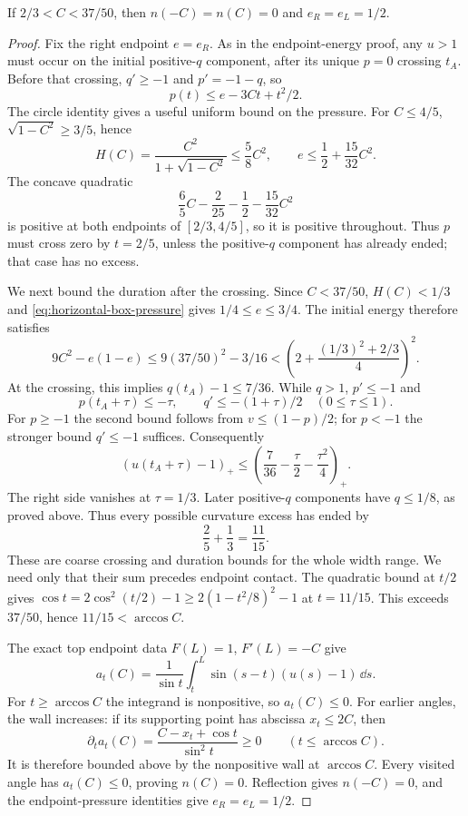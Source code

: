 \begin{lemma}\label{lem:horizontal-dry}
If $2/3<C<37/50$, then $n(-C)=n(C)=0$ and $e_R=e_L=1/2$.
\end{lemma}
\begin{proof}
Fix the right endpoint $e=e_R$. As in the endpoint-energy proof,
any $u>1$ must occur on the initial positive-$q$ component, after
its unique $p=0$ crossing $t_A$. Before that crossing,
$q'\ge-1$ and $p'=-1-q$, so
\[
 p(t)\le e-3Ct+t^2/2.
\]
The circle identity gives a useful uniform bound on the pressure.
For $C\le4/5$, $\sqrt{1-C^2}\ge3/5$, hence
\[
 H(C)=\frac{C^2}{1+\sqrt{1-C^2}}\le\frac58C^2,
 \qquad e\le\frac12+\frac{15}{32}C^2.
\]
The concave quadratic
\[
 \frac65C-\frac2{25}-\frac12-\frac{15}{32}C^2
\]
is positive at both endpoints of $[2/3,4/5]$, so it is positive
throughout. Thus $p$ must cross zero by $t=2/5$, unless the
positive-$q$ component has already ended; that case has no excess.

We next bound the duration after the crossing. Since $C<37/50$,
$H(C)<1/3$ and \eqref{eq:horizontal-box-pressure} gives
$1/4\le e\le3/4$. The initial energy therefore satisfies
\[
 9C^2-e(1-e)
 \le9(37/50)^2-3/16
 <\left(2+\frac{(1/3)^2+2/3}{4}\right)^2.
\]
At the crossing, this implies $q(t_A)-1\le7/36$.
While $q>1$, $p'\le-1$ and
\[
 p(t_A+\tau)\le-\tau,\qquad
 q'\le-(1+\tau)/2\quad(0\le\tau\le1).
\]
For $p\ge-1$ the second bound follows from $v\le(1-p)/2$;
for $p<-1$ the stronger bound $q'\le-1$ suffices.
Consequently
\begin{equation}\label{eq:horizontal-leakage-envelope}
 (u(t_A+\tau)-1)_+
 \le\left(\frac7{36}-\frac\tau2-\frac{\tau^2}4\right)_+.
\end{equation}
The right side vanishes at $\tau=1/3$. Later positive-$q$
components have $q\le1/8$, as proved above. Thus every possible
curvature excess has ended by
\[
 \frac25+\frac13=\frac{11}{15}.
\]
These are coarse crossing and duration bounds for the whole width
range. We need only that their sum precedes endpoint contact.
The quadratic bound at $t/2$ gives
$\cos t=2\cos^2(t/2)-1\ge2(1-t^2/8)^2-1$ at $t=11/15$.
This exceeds $37/50$, hence $11/15<\arccos C$.

The exact top endpoint data $F(L)=1$, $F'(L)=-C$ give
\[
 a_t(C)=\frac1{\sin t}\int_t^L\sin(s-t)(u(s)-1)\,\dd s.
\]
For $t\ge\arccos C$ the integrand is nonpositive, so $a_t(C)\le0$.
For earlier angles, the wall increases: if its supporting point
has abscissa $x_t\le2C$, then
\[
 \partial_t a_t(C)
 =\frac{C-x_t+\cos t}{\sin^2t}\ge0
 \qquad(t\le\arccos C).
\]
It is therefore bounded above by the nonpositive wall at
$\arccos C$. Every visited angle has $a_t(C)\le0$, proving
$n(C)=0$. Reflection gives $n(-C)=0$, and the endpoint-pressure
identities give $e_R=e_L=1/2$.
\end{proof}

